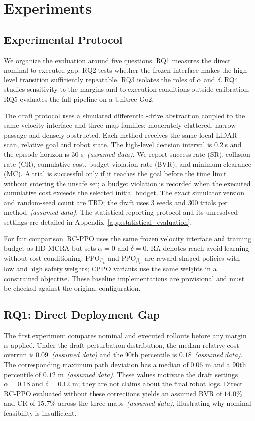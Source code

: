 \documentclass{article}
\begin{document}
\section{Experiments}
\subsection{Experimental Protocol}
We organize the evaluation around five questions. RQ1 measures the direct
nominal-to-executed gap. RQ2 tests whether the frozen interface makes the
high-level transition sufficiently repeatable. RQ3 isolates the roles of $\alpha$
and $\delta$. RQ4 studies sensitivity to the margins and to execution conditions
outside calibration. RQ5 evaluates the full pipeline on a Unitree Go2.

The draft protocol uses a simulated differential-drive abstraction coupled to the
same velocity interface and three map families: moderately cluttered, narrow
passage and densely obstructed. Each method receives the same local LiDAR scan,
relative goal and robot state. The high-level decision interval is 0.2 s and the
episode horizon is 30 s~\textit{(assumed data)}. We report success rate (SR),
collision rate (CR), cumulative cost, budget violation rate (BVR), and minimum
clearance (MC). A trial is successful only if it reaches the goal before the time
limit without entering the unsafe set; a budget violation is recorded when the
executed cumulative cost exceeds the selected initial budget. The exact simulator
version and random-seed count are \textsc{TBD}; the draft uses 3 seeds and 300
trials per method~\textit{(assumed data)}.
The statistical reporting protocol and its unresolved settings are detailed in
Appendix~\ref{app:statistical_evaluation}.

For fair comparison, RC-PPO uses the same frozen velocity interface and training
budget as HD-MCRA but sets $\alpha=0$ and $\delta=0$. RA denotes reach-avoid
learning without cost conditioning. PPO$_{\beta_L}$ and PPO$_{\beta_H}$ are
reward-shaped policies with low and high safety weights; CPPO variants use the same
weights in a constrained objective. These baseline implementations are provisional
and must be checked against the original configuration.

\subsection{RQ1: Direct Deployment Gap}
The first experiment compares nominal and executed rollouts before any margin is
applied. Under the draft perturbation distribution, the median relative cost
overrun is $0.09$~\textit{(assumed data)} and the 90th percentile is
$0.18$~\textit{(assumed data)}. The corresponding maximum path deviation has a
median of $0.06$ m and a 90th percentile of $0.12$ m~\textit{(assumed data)}.
These values motivate the draft settings $\alpha=0.18$ and $\delta=0.12$ m; they
are not claims about the final robot logs. Direct RC-PPO evaluated without these
corrections yields an assumed BVR of $14.0\%$ and CR of $15.7\%$ across the three
maps~\textit{(assumed data)}, illustrating why nominal feasibility is insufficient.
\end{document}
